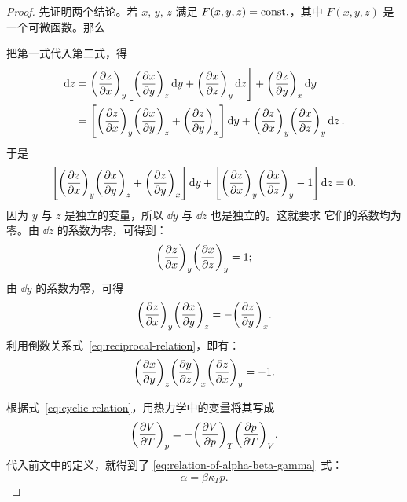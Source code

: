 \begin{proof}
  先证明两个结论。若 $x, \, y, \, z$ 满足 $F(x, y, z) = \text{const.}$，其中
  $F(x, y, z)$ 是一个可微函数。那么
  把第一式代入第二式，得
  \begin{align}
    \dd{z} &= \qty(\pdv{z}{x})_y
      \qty[\qty(\pdv{x}{y})_z \dd{y} + \qty(\pdv{x}{z})_y \dd{z}]
      + \qty(\pdv{z}{y})_x \dd{y} \notag \\
    &= \qty[\qty(\pdv{z}{x})_y \qty(\pdv{x}{y})_z + \qty(\pdv{z}{y})_x] \dd{y}
      + \qty(\pdv{z}{x})_y \qty(\pdv{x}{z})_y \dd{z}.
  \end{align}
  于是
  \begin{equation} \label{eq:coefficient-of-dy-and-dz}
    \qty[\qty(\pdv{z}{x})_y \qty(\pdv{x}{y})_z + \qty(\pdv{z}{y})_x] \dd{y}
    + \qty[\qty(\pdv{z}{x})_y \qty(\pdv{x}{z})_y - 1] \dd{z} = 0.
  \end{equation}
  因为 $y$ 与 $z$ 是独立的变量，所以 $\dd{y}$ 与 $\dd{z}$ 也是独立的。这就要求
  它们的系数均为零。由 $\dd{z}$ 的系数为零，可得到：
  \begin{equation} \label{eq:reciprocal-relation}
    \qty(\pdv{z}{x})_y \qty(\pdv{x}{z})_y = 1;
  \end{equation}
  由 $\dd{y}$ 的系数为零，可得
  \begin{equation} \label{eq:cyclic-relation}
    \qty(\pdv{z}{x})_y \qty(\pdv{x}{y})_z = -\qty(\pdv{z}{y})_x.
  \end{equation}
  利用倒数关系式~\eqref{eq:reciprocal-relation}，即有：
  \begin{equation}
    \qty(\pdv{x}{y})_z \qty(\pdv{y}{z})_x \qty(\pdv{z}{x})_y = -1.
  \end{equation}

  根据式~\eqref{eq:cyclic-relation}，用热力学中的变量将其写成
  \begin{equation}
    \qty(\pdv{V}{T})_p = -\qty(\pdv{V}{p})_T \qty(\pdv{p}{T})_V.
  \end{equation}
  代入前文中的定义，就得到了 \eqref{eq:relation-of-alpha-beta-gamma}~式：
  \begin{equation}
    \alpha = \beta \kappa_T p.
  \end{equation}
\end{proof}

